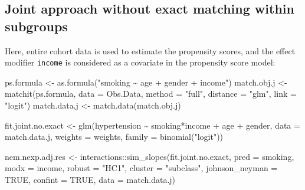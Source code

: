 \documentclass[
  letterpaper,
  DIV=11,
  numbers=noendperiod]{scrreprt}
\newenvironment{Shaded}{\begin{snugshade}}{\end{snugshade}}
\newcommand{\AttributeTok}[1]{\textcolor[rgb]{0.40,0.45,0.13}{#1}}
\newcommand{\ConstantTok}[1]{\textcolor[rgb]{0.56,0.35,0.01}{#1}}
\newcommand{\FunctionTok}[1]{\textcolor[rgb]{0.28,0.35,0.67}{#1}}
\newcommand{\NormalTok}[1]{\textcolor[rgb]{0.00,0.23,0.31}{#1}}
\newcommand{\OtherTok}[1]{\textcolor[rgb]{0.00,0.23,0.31}{#1}}
\newcommand{\SpecialCharTok}[1]{\textcolor[rgb]{0.37,0.37,0.37}{#1}}
\newcommand{\StringTok}[1]{\textcolor[rgb]{0.13,0.47,0.30}{#1}}
\begin{document}
\hypertarget{joint-approach-without-exact-matching-within-subgroups}{%
\subsection{Joint approach without exact matching within
subgroups}\label{joint-approach-without-exact-matching-within-subgroups}}

Here, entire cohort data is used to estimate the propensity scores, and
the effect modifier \texttt{income} is considered as a covariate in the
propensity score model:

\begin{Shaded}
\begin{Highlighting}[]
\NormalTok{ps.formula }\OtherTok{\textless{}{-}} \FunctionTok{as.formula}\NormalTok{(}\StringTok{"smoking \textasciitilde{} age + gender + income"}\NormalTok{)}
\NormalTok{match.obj.j }\OtherTok{\textless{}{-}} \FunctionTok{matchit}\NormalTok{(ps.formula, }\AttributeTok{data =}\NormalTok{ Obs.Data,}
                      \AttributeTok{method =} \StringTok{"full"}\NormalTok{, }
                      \AttributeTok{distance =} \StringTok{"glm"}\NormalTok{,}
                      \AttributeTok{link =} \StringTok{"logit"}\NormalTok{)}
\NormalTok{match.data.j }\OtherTok{\textless{}{-}} \FunctionTok{match.data}\NormalTok{(match.obj.j)}
\end{Highlighting}
\end{Shaded}

\begin{Shaded}
\begin{Highlighting}[]
\NormalTok{fit.joint.no.exact }\OtherTok{\textless{}{-}} \FunctionTok{glm}\NormalTok{(hypertension }\SpecialCharTok{\textasciitilde{}}\NormalTok{ smoking}\SpecialCharTok{*}\NormalTok{income }\SpecialCharTok{+}\NormalTok{ age }\SpecialCharTok{+}\NormalTok{ gender, }
                          \AttributeTok{data =}\NormalTok{ match.data.j, }
                          \AttributeTok{weights =}\NormalTok{ weights,}
                          \AttributeTok{family =} \FunctionTok{binomial}\NormalTok{(}\StringTok{"logit"}\NormalTok{))}

\NormalTok{nem.nexp.adj.res }\OtherTok{\textless{}{-}}\NormalTok{ interactions}\SpecialCharTok{::}\FunctionTok{sim\_slopes}\NormalTok{(fit.joint.no.exact, }
                                             \AttributeTok{pred =}\NormalTok{ smoking, }
                                             \AttributeTok{modx =}\NormalTok{ income,}
                                             \AttributeTok{robust =} \StringTok{"HC1"}\NormalTok{, }
                                             \AttributeTok{cluster =} \StringTok{"subclass"}\NormalTok{,}
                                             \AttributeTok{johnson\_neyman =} \ConstantTok{TRUE}\NormalTok{, }
                                             \AttributeTok{confint =} \ConstantTok{TRUE}\NormalTok{,}
                                             \AttributeTok{data =}\NormalTok{ match.data.j)}
\end{Highlighting}
\end{Shaded}
\end{document}
